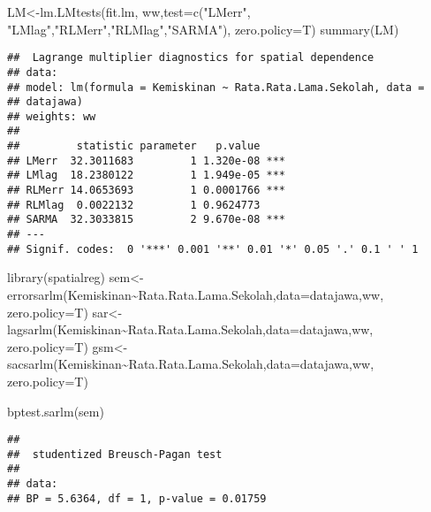 \documentclass[
]{book}
\newenvironment{Shaded}{\begin{snugshade}}{\end{snugshade}}
\newcommand{\AttributeTok}[1]{\textcolor[rgb]{0.77,0.63,0.00}{#1}}
\newcommand{\FunctionTok}[1]{\textcolor[rgb]{0.00,0.00,0.00}{#1}}
\newcommand{\NormalTok}[1]{#1}
\newcommand{\OtherTok}[1]{\textcolor[rgb]{0.56,0.35,0.01}{#1}}
\newcommand{\SpecialCharTok}[1]{\textcolor[rgb]{0.00,0.00,0.00}{#1}}
\newcommand{\StringTok}[1]{\textcolor[rgb]{0.31,0.60,0.02}{#1}}
\begin{document}
\begin{Shaded}
\begin{Highlighting}[]
\NormalTok{LM}\OtherTok{\textless{}{-}}\FunctionTok{lm.LMtests}\NormalTok{(fit.lm, ww,}\AttributeTok{test=}\FunctionTok{c}\NormalTok{(}\StringTok{"LMerr"}\NormalTok{, }\StringTok{"LMlag"}\NormalTok{,}\StringTok{"RLMerr"}\NormalTok{,}\StringTok{"RLMlag"}\NormalTok{,}\StringTok{"SARMA"}\NormalTok{), }\AttributeTok{zero.policy=}\NormalTok{T)}
\FunctionTok{summary}\NormalTok{(LM)}
\end{Highlighting}
\end{Shaded}

\begin{verbatim}
##  Lagrange multiplier diagnostics for spatial dependence
## data:  
## model: lm(formula = Kemiskinan ~ Rata.Rata.Lama.Sekolah, data =
## datajawa)
## weights: ww
##  
##         statistic parameter   p.value    
## LMerr  32.3011683         1 1.320e-08 ***
## LMlag  18.2380122         1 1.949e-05 ***
## RLMerr 14.0653693         1 0.0001766 ***
## RLMlag  0.0022132         1 0.9624773    
## SARMA  32.3033815         2 9.670e-08 ***
## ---
## Signif. codes:  0 '***' 0.001 '**' 0.01 '*' 0.05 '.' 0.1 ' ' 1
\end{verbatim}

\begin{Shaded}
\begin{Highlighting}[]
\FunctionTok{library}\NormalTok{(spatialreg)}
\NormalTok{sem}\OtherTok{\textless{}{-}}\FunctionTok{errorsarlm}\NormalTok{(Kemiskinan}\SpecialCharTok{\textasciitilde{}}\NormalTok{Rata.Rata.Lama.Sekolah,}\AttributeTok{data=}\NormalTok{datajawa,ww, }\AttributeTok{zero.policy=}\NormalTok{T)}
\NormalTok{sar}\OtherTok{\textless{}{-}}\FunctionTok{lagsarlm}\NormalTok{(Kemiskinan}\SpecialCharTok{\textasciitilde{}}\NormalTok{Rata.Rata.Lama.Sekolah,}\AttributeTok{data=}\NormalTok{datajawa,ww, }\AttributeTok{zero.policy=}\NormalTok{T)}
\NormalTok{gsm}\OtherTok{\textless{}{-}}\FunctionTok{sacsarlm}\NormalTok{(Kemiskinan}\SpecialCharTok{\textasciitilde{}}\NormalTok{Rata.Rata.Lama.Sekolah,}\AttributeTok{data=}\NormalTok{datajawa,ww, }\AttributeTok{zero.policy=}\NormalTok{T)}

\FunctionTok{bptest.sarlm}\NormalTok{(sem)}
\end{Highlighting}
\end{Shaded}

\begin{verbatim}
## 
##  studentized Breusch-Pagan test
## 
## data:  
## BP = 5.6364, df = 1, p-value = 0.01759
\end{verbatim}
\end{document}
